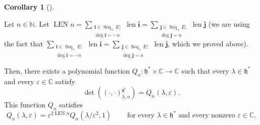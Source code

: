 \documentclass
[numbers=enddot,12pt,final,onecolumn,german,notitlepage]{scrartcl}%
\theoremstyle{definition}
\newtheorem{coro}[theo]{Corollary}
\newenvironment{corollary}[1][]
{\begin{coro}[#1]\begin{leftbar}}
{\end{leftbar}\end{coro}}
\begin{document}
\begin{corollary}
\label{cor.invformnondeg.polynomiality}Let $n\in\mathbb{N}$. Let
$\operatorname*{LEN}n=\sum\limits_{\substack{\mathbf{i}\in\operatorname*{Seq}%
\nolimits_{+}E;\\\deg\mathbf{i}=-n}}\operatorname*{len}\mathbf{i=}%
\sum\limits_{\substack{\mathbf{j}\in\operatorname*{Seq}\nolimits_{+}%
E;\\\deg\mathbf{j}=n}}\operatorname*{len}\mathbf{j}$ (we are using the fact
that $\sum\limits_{\substack{\mathbf{i}\in\operatorname*{Seq}\nolimits_{+}%
E;\\\deg\mathbf{i}=-n}}\operatorname*{len}\mathbf{i=}\sum
\limits_{\substack{\mathbf{j}\in\operatorname*{Seq}\nolimits_{+}%
E;\\\deg\mathbf{j}=n}}\operatorname*{len}\mathbf{j}$, which we proved above).

Then, there exists a polynomial function $Q_{n}:\mathfrak{h}^{\ast}%
\times\mathbb{C}\rightarrow\mathbb{C}$ such that every $\lambda\in
\mathfrak{h}^{\ast}$ and every $\varepsilon\in\mathbb{C}$ satisfy%
\begin{equation}
\det\left(  \left(  \cdot,\cdot\right)  _{\lambda,n}^{\mathfrak{g}%
^{\varepsilon}}\right)  =Q_{n}\left(  \lambda,\varepsilon\right)  .
\label{cor.invformnondeg.polynomiality.1}%
\end{equation}
This function $Q_{n}$ satisfies%
\[
Q_{n}\left(  \lambda,\varepsilon\right)  =\varepsilon^{2\operatorname*{LEN}%
n}Q_{n}\left(  \lambda/\varepsilon^{2},1\right)  \ \ \ \ \ \ \ \ \ \ \text{for
every }\lambda\in\mathfrak{h}^{\ast}\text{ and every nonzero }\varepsilon
\in\mathbb{C}.
\]

\end{corollary}
\end{document}
